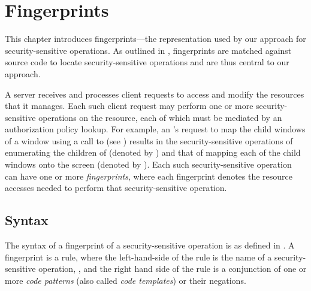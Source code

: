 \chapter{Fingerprints}
\label{chapter:fingerprints}

This chapter introduces fingerprints---the representation used by our approach
for security-sensitive operations. As outlined in ,
fingerprints are matched against source code to locate security-sensitive
operations and are thus central to our approach.

A server receives and processes client requests to access and modify the
resources that it manages. Each such client request may perform one or more
security-sensitive operations on the resource, each of which must be mediated
by an authorization policy lookup. For example, an \xclient's request to map
the child windows of a window  using a call to
 (see ) results in the
security-sensitive operations of enumerating the children of 
(denoted by ) and that of mapping each of the child
windows onto the screen (denoted by ). Each such
security-sensitive operation can have one or more \textit{fingerprints}, 
where each fingerprint denotes the resource accesses needed to perform that
security-sensitive operation.


\section{Syntax}
\label{chapter:fingerprints:syntax}

The syntax of a fingerprint of a security-sensitive operation  is as
defined in . A fingerprint is a rule,
where the left-hand-side of the rule is the name of a security-sensitive
operation, , and the right hand side of the rule is a conjunction
of one or more \textit{code patterns} (also called \textit{code templates})
or their negations.

